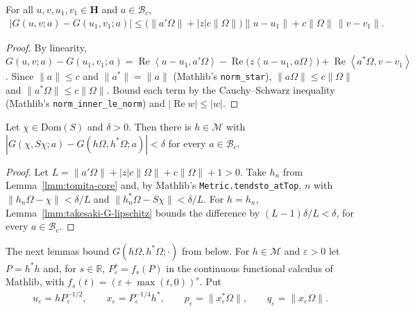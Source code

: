 \begin{lemma}
    \label{lmm:takesaki-G-lipschitz}
    \leanok
    For all $u, v, u_1, v_1 \in \mathbf{H}$ and $a \in \mathcal{B}_c$,
    \begin{align}
        |G(u, v; a) - G(u_1, v_1; a)| \le \big( \|a'\Omega\| + |z|c\|\Omega\| \big)\|u - u_1\| + c\|\Omega\|\,\|v - v_1\|.
    \end{align}
\end{lemma}
\begin{proof}
    \leanok
    By linearity, $G(u, v; a) - G(u_1, v_1; a) = \operatorname{Re}\left< u - u_1, a'\Omega \right> - \operatorname{Re}\big( z\left< u - u_1, a\Omega \right> \big) + \operatorname{Re}\left< a^*\Omega, v - v_1 \right>$. Since $\|a\| \le c$ and $\|a^*\| = \|a\|$ (Mathlib's \texttt{norm\_star}), $\|a\Omega\| \le c\|\Omega\|$ and $\|a^*\Omega\| \le c\|\Omega\|$. Bound each term by the Cauchy--Schwarz inequality (Mathlib's \texttt{norm\_inner\_le\_norm}) and $|\operatorname{Re} w| \le |w|$.
\end{proof}

\begin{lemma}
    \label{lmm:takesaki-uniform-approximation}
    \leanok
    Let $\chi \in \text{Dom}(S)$ and $\delta > 0$. Then there is $h \in \mathcal{M}$ with $|G(\chi, S\chi; a) - G(h\Omega, h^*\Omega; a)| < \delta$ for every $a \in \mathcal{B}_c$.
\end{lemma}
\begin{proof}
    \leanok
    Let $L = \|a'\Omega\| + |z|c\|\Omega\| + c\|\Omega\| + 1 > 0$. Take $h_n$ from Lemma~\ref{lmm:tomita-core} and, by Mathlib's \texttt{Metric.tendsto\_atTop}, $n$ with $\|h_n\Omega - \chi\| < \delta/L$ and $\|h_n^*\Omega - S\chi\| < \delta/L$. For $h = h_n$, Lemma~\ref{lmm:takesaki-G-lipschitz} bounds the difference by $(L - 1)\delta/L < \delta$, for every $a \in \mathcal{B}_c$.
\end{proof}

The next lemmas bound $G(h\Omega, h^*\Omega; \cdot)$ from below. For $h \in \mathcal{M}$ and $\varepsilon > 0$ let $P = h^*h$ and, for $s \in \mathbb{R}$, $P_\varepsilon^s = f_s(P)$ in the continuous functional calculus of Mathlib, with $f_s(t) = (\varepsilon + \max(t, 0))^s$. Put
\begin{align}
    u_\varepsilon = hP_\varepsilon^{-1/2}, \qquad x_\varepsilon = P_\varepsilon^{-1/4}h^*, \qquad p_\varepsilon = \|x_\varepsilon^*\Omega\|, \qquad q_\varepsilon = \|x_\varepsilon\Omega\|.
\end{align}

